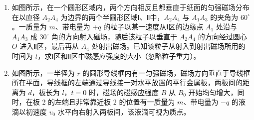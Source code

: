 \documentclass[\gkver]{gaokaozhenti}
\begin{document}
\begin{enumerate}


\item
如图所示，在一个圆形区域内，两个方向相反且都垂直于纸面的匀强磁场分布在以直径 $A_{2}A_{4}$ 为边界的两个半圆形区域Ⅰ、Ⅱ中，$A_{2}A_{4}$ 与 $A_{1}A_{3}$ 的夹角为 $60^{\circ}$。一质量为 $m$、带电量为 $+q$ 的粒子以某一速度从Ⅰ区的边缘点 $A_{1}$ 处沿与 $A_{1}A_{3}$ 成 $30^{\circ}$ 角的方向射入磁场，随后该粒子以垂直于 $A_{2}A_{4}$ 的方向经过圆心 $O$ 进入Ⅱ区，最后再从 $A_{4}$ 处射出磁场。已知该粒子从射入到射出磁场所用的时间为 $t$，求Ⅰ区和Ⅱ区中磁感应强度的大小（忽略粒子重力）。




\item
如图所示，一半径为 $r$ 的圆形导线框内有一匀强磁场，磁场方向垂直于导线框所在平面，导线框的左端通过导线接一对水平放置的平行金属板，两板间的距离为 $d$，板长为 $l$，$t=0$ 时，磁场的磁感应强度 $B$ 从 $B_{0}$ 开始均匀增大，同时，在板 2 的左端且非常靠近板 2 的位置有一质量为 $m$、带电量为 $-q$ 的液滴以初速度 $v_{0}$ 水平向右射入两板间，该液滴可视为质点。


\end{enumerate}
\end{document}
